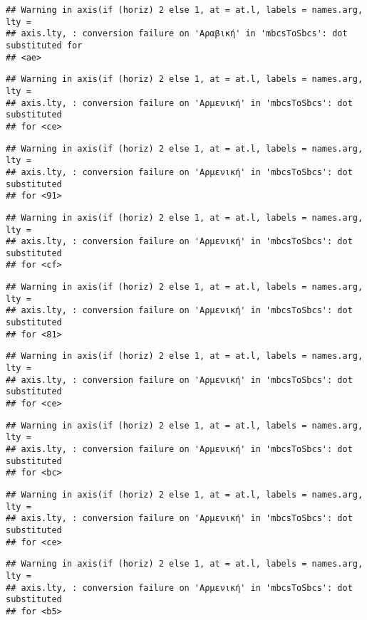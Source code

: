 \documentclass[
]{article}
\begin{document}
\begin{verbatim}
## Warning in axis(if (horiz) 2 else 1, at = at.l, labels = names.arg, lty =
## axis.lty, : conversion failure on 'Αραβική' in 'mbcsToSbcs': dot substituted for
## <ae>
\end{verbatim}

\begin{verbatim}
## Warning in axis(if (horiz) 2 else 1, at = at.l, labels = names.arg, lty =
## axis.lty, : conversion failure on 'Αρμενική' in 'mbcsToSbcs': dot substituted
## for <ce>
\end{verbatim}

\begin{verbatim}
## Warning in axis(if (horiz) 2 else 1, at = at.l, labels = names.arg, lty =
## axis.lty, : conversion failure on 'Αρμενική' in 'mbcsToSbcs': dot substituted
## for <91>
\end{verbatim}

\begin{verbatim}
## Warning in axis(if (horiz) 2 else 1, at = at.l, labels = names.arg, lty =
## axis.lty, : conversion failure on 'Αρμενική' in 'mbcsToSbcs': dot substituted
## for <cf>
\end{verbatim}

\begin{verbatim}
## Warning in axis(if (horiz) 2 else 1, at = at.l, labels = names.arg, lty =
## axis.lty, : conversion failure on 'Αρμενική' in 'mbcsToSbcs': dot substituted
## for <81>
\end{verbatim}

\begin{verbatim}
## Warning in axis(if (horiz) 2 else 1, at = at.l, labels = names.arg, lty =
## axis.lty, : conversion failure on 'Αρμενική' in 'mbcsToSbcs': dot substituted
## for <ce>
\end{verbatim}

\begin{verbatim}
## Warning in axis(if (horiz) 2 else 1, at = at.l, labels = names.arg, lty =
## axis.lty, : conversion failure on 'Αρμενική' in 'mbcsToSbcs': dot substituted
## for <bc>
\end{verbatim}

\begin{verbatim}
## Warning in axis(if (horiz) 2 else 1, at = at.l, labels = names.arg, lty =
## axis.lty, : conversion failure on 'Αρμενική' in 'mbcsToSbcs': dot substituted
## for <ce>
\end{verbatim}

\begin{verbatim}
## Warning in axis(if (horiz) 2 else 1, at = at.l, labels = names.arg, lty =
## axis.lty, : conversion failure on 'Αρμενική' in 'mbcsToSbcs': dot substituted
## for <b5>
\end{verbatim}
\end{document}
